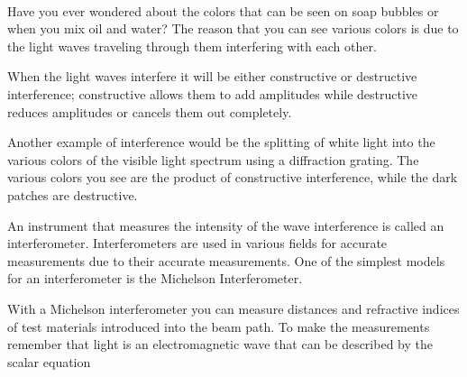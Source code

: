 \paragraph{}
	Have you ever wondered about the colors that can be seen on soap bubbles or when you mix oil and water? The reason that you can see various colors is due to the light waves traveling through them interfering with each other. 

	When the light waves interfere it will be either constructive or destructive interference; constructive allows them to add amplitudes while destructive reduces amplitudes or cancels them out completely.

	Another example of interference would be the splitting of white light into the various colors of the visible light spectrum using a diffraction grating. The various colors you see are the product of constructive interference, while the dark patches are destructive.

    An instrument that measures the intensity of the wave interference is called an interferometer. Interferometers are used in various fields for accurate measurements due to their accurate measurements. One of the simplest models for an interferometer is the Michelson Interferometer.

	With a Michelson interferometer you can measure distances and refractive indices of test materials introduced into the beam path. To make the measurements remember that light is an electromagnetic wave that can be described by the scalar equation

